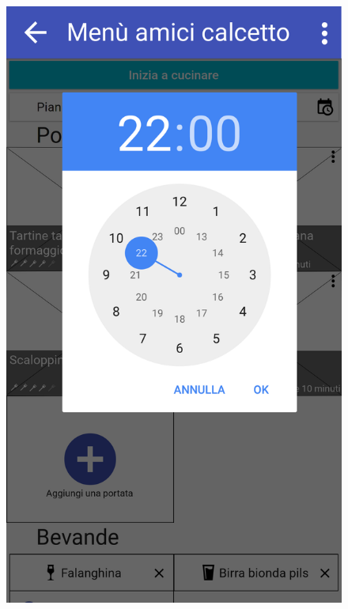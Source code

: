 \begin{figure}[H]
	\begin{minipage}{.49\textwidth}
		\includegraphics[width=\textwidth]{img/wireframe/men_amici_calcetto_ora_ore.png}
	\end{minipage}
	\begin{minipage}{.49\textwidth}

\end{minipage}
\end{figure}
